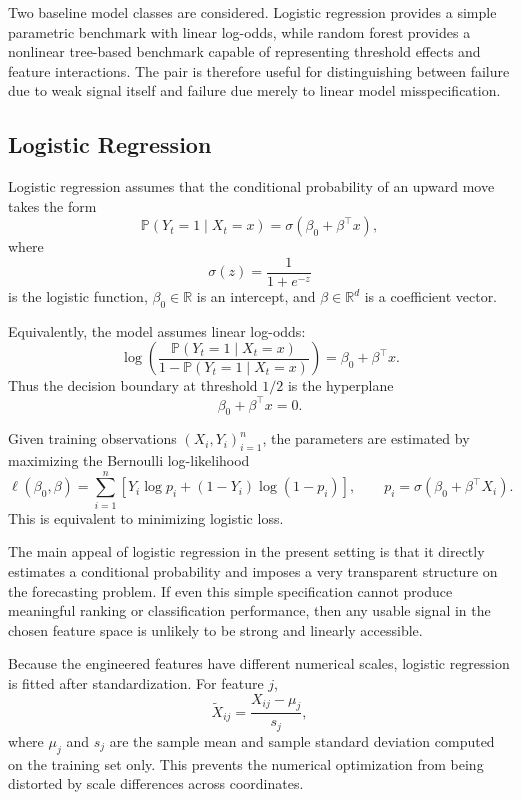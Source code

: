 \documentclass[11pt,a4paper]{article}
\begin{document}
	Two baseline model classes are considered. Logistic regression provides a simple parametric benchmark with linear log-odds, while random forest provides a nonlinear tree-based benchmark capable of representing threshold effects and feature interactions. The pair is therefore useful for distinguishing between failure due to weak signal itself and failure due merely to linear model misspecification.
	
	\subsection{Logistic Regression}
	
	Logistic regression assumes that the conditional probability of an upward move takes the form
	\[
	\mathbb{P}(Y_t = 1 \mid X_t = x)
	=
	\sigma(\beta_0 + \beta^\top x),
	\]
	where
	\[
	\sigma(z) = \frac{1}{1+e^{-z}}
	\]
	is the logistic function, \(\beta_0 \in \mathbb{R}\) is an intercept, and \(\beta \in \mathbb{R}^d\) is a coefficient vector.
	
	Equivalently, the model assumes linear log-odds:
	\[
	\log \left(
	\frac{\mathbb{P}(Y_t = 1 \mid X_t = x)}
	{1-\mathbb{P}(Y_t = 1 \mid X_t = x)}
	\right)
	=
	\beta_0 + \beta^\top x.
	\]
	Thus the decision boundary at threshold \(1/2\) is the hyperplane
	\[
	\beta_0 + \beta^\top x = 0.
	\]
	
	Given training observations \((X_i,Y_i)_{i=1}^n\), the parameters are estimated by maximizing the Bernoulli log-likelihood
	\[
	\ell(\beta_0,\beta)
	=
	\sum_{i=1}^n
	\left[
	Y_i \log p_i + (1-Y_i)\log(1-p_i)
	\right],
	\qquad
	p_i = \sigma(\beta_0 + \beta^\top X_i).
	\]
	This is equivalent to minimizing logistic loss.
	
	The main appeal of logistic regression in the present setting is that it directly estimates a conditional probability and imposes a very transparent structure on the forecasting problem. If even this simple specification cannot produce meaningful ranking or classification performance, then any usable signal in the chosen feature space is unlikely to be strong and linearly accessible.
	
	Because the engineered features have different numerical scales, logistic regression is fitted after standardization. For feature \(j\),
	\[
	\widetilde{X}_{ij} = \frac{X_{ij} - \mu_j}{s_j},
	\]
	where \(\mu_j\) and \(s_j\) are the sample mean and sample standard deviation computed on the training set only. This prevents the numerical optimization from being distorted by scale differences across coordinates.
	
\end{document}
